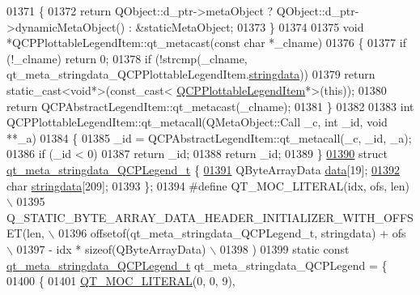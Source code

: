\begin{DoxyCode}
01371 \textcolor{keyword}{}\{
01372     \textcolor{keywordflow}{return} QObject::d\_ptr->metaObject ? QObject::d\_ptr->dynamicMetaObject() : &staticMetaObject;
01373 \}
01374 
01375 \textcolor{keywordtype}{void} *QCPPlottableLegendItem::qt\_metacast(\textcolor{keyword}{const} \textcolor{keywordtype}{char} *\_clname)
01376 \{
01377     \textcolor{keywordflow}{if} (!\_clname) \textcolor{keywordflow}{return} 0;
01378     \textcolor{keywordflow}{if} (!strcmp(\_clname, qt\_meta\_stringdata\_QCPPlottableLegendItem.\hyperlink{a00067_a25e998eb002b6a9f9e969afa5247748f}{stringdata}))
01379         \textcolor{keywordflow}{return} \textcolor{keyword}{static\_cast<}\textcolor{keywordtype}{void}*\textcolor{keyword}{>}(\textcolor{keyword}{const\_cast<} \hyperlink{a00048}{QCPPlottableLegendItem}*\textcolor{keyword}{>}(\textcolor{keyword}{this}));
01380     \textcolor{keywordflow}{return} QCPAbstractLegendItem::qt\_metacast(\_clname);
01381 \}
01382 
01383 \textcolor{keywordtype}{int} QCPPlottableLegendItem::qt\_metacall(QMetaObject::Call \_c, \textcolor{keywordtype}{int} \_id, \textcolor{keywordtype}{void} **\_a)
01384 \{
01385     \_id = QCPAbstractLegendItem::qt\_metacall(\_c, \_id, \_a);
01386     \textcolor{keywordflow}{if} (\_id < 0)
01387         \textcolor{keywordflow}{return} \_id;
01388     \textcolor{keywordflow}{return} \_id;
01389 \}
\hypertarget{a00067_source_l01390}{}\hyperlink{a00067}{01390} \textcolor{keyword}{struct }\hyperlink{a00067_dc/d31/a00208}{qt\_meta\_stringdata\_QCPLegend\_t} \{
\hypertarget{a00067_source_l01391}{}\hyperlink{a00067_abb2a7af4ffa957bddb891b5663c0aa55}{01391}     QByteArrayData \hyperlink{a00067_abb2a7af4ffa957bddb891b5663c0aa55}{data}[19];
\hypertarget{a00067_source_l01392}{}\hyperlink{a00067_a26b79395b8d9f94641f81b197841ede1}{01392}     \textcolor{keywordtype}{char} \hyperlink{a00067_a26b79395b8d9f94641f81b197841ede1}{stringdata}[209];
01393 \};
01394 \textcolor{preprocessor}{#define QT\_MOC\_LITERAL(idx, ofs, len) \(\backslash\)}
01395 \textcolor{preprocessor}{    Q\_STATIC\_BYTE\_ARRAY\_DATA\_HEADER\_INITIALIZER\_WITH\_OFFSET(len, \(\backslash\)}
01396 \textcolor{preprocessor}{    offsetof(qt\_meta\_stringdata\_QCPLegend\_t, stringdata) + ofs \(\backslash\)}
01397 \textcolor{preprocessor}{        - idx * sizeof(QByteArrayData) \(\backslash\)}
01398 \textcolor{preprocessor}{    )}
01399 \textcolor{keyword}{static} \textcolor{keyword}{const} \hyperlink{a00067_dc/d31/a00208}{qt\_meta\_stringdata\_QCPLegend\_t} qt\_meta\_stringdata\_QCPLegend = \{
01400     \{
01401 \hyperlink{a00067_a75bb9482d242cde0a06c9dbdc6b83abe}{QT\_MOC\_LITERAL}(0, 0, 9),

\end{DoxyCode}
